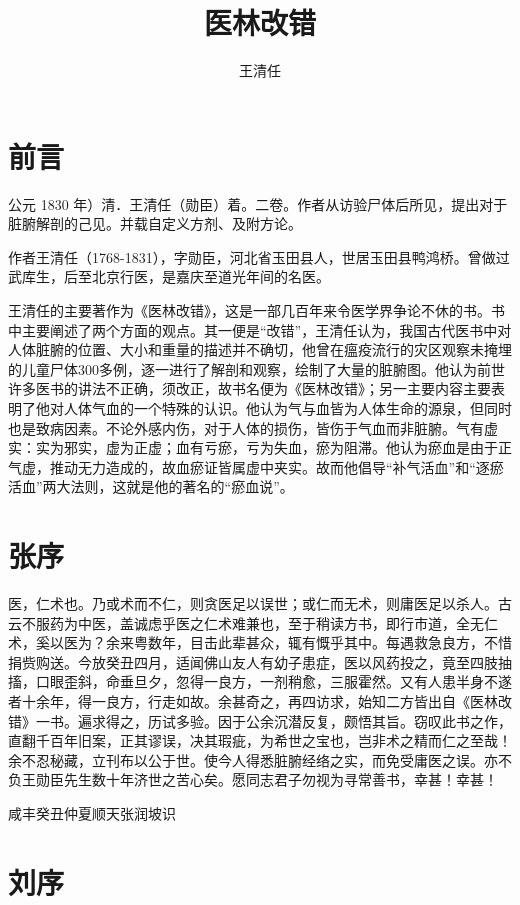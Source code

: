 \documentclass[a4paper,12pt,UTF8,twoside]{ctexbook}
\title{\heiti\zihao{0} 医林改错}
\author{王清任}
\date{}
\begin{document}
	
	\maketitle
	\tableofcontents
	\frontmatter
	
	\chapter{前言}
	公元 1830 年）清．王清任（勋臣）着。二卷。作者从访验尸体后所见，提出对于脏腑解剖的己见。并载自定义方剂、及附方论。
	
	作者王清任（1768-1831），字勋臣，河北省玉田县人，世居玉田县鸭鸿桥。曾做过武库生，后至北京行医，是嘉庆至道光年间的名医。
	
	王清任的主要著作为《医林改错》，这是一部几百年来令医学界争论不休的书。书中主要阐述了两个方面的观点。其一便是“改错”，王清任认为，我国古代医书中对人体脏腑的位置、大小和重量的描述并不确切，他曾在瘟疫流行的灾区观察未掩埋的儿童尸体300多例，逐一进行了解剖和观察，绘制了大量的脏腑图。他认为前世许多医书的讲法不正确，须改正，故书名便为《医林改错》；另一主要内容主要表明了他对人体气血的一个特殊的认识。他认为气与血皆为人体生命的源泉，但同时也是致病因素。不论外感内伤，对于人体的损伤，皆伤于气血而非脏腑。气有虚实：实为邪实，虚为正虚；血有亏瘀，亏为失血，瘀为阻滞。他认为瘀血是由于正气虚，推动无力造成的，故血瘀证皆属虚中夹实。故而他倡导“补气活血”和“逐瘀活血”两大法则，这就是他的著名的“瘀血说”。
	
	\chapter{张序}
	医，仁术也。乃或术而不仁，则贪医足以误世；或仁而无术，则庸医足以杀人。古云不服药为中医，盖诚虑乎医之仁术难兼也，至于稍读方书，即行市道，全无仁术，奚以医为？余来粤数年，目击此辈甚众，辄有慨乎其中。每遇救急良方，不惜捐赀购送。今放癸丑四月，适闻佛山友人有幼子患症，医以风药投之，竟至四肢抽搐，口眼歪斜，命垂旦夕，忽得一良方，一剂稍愈，三服霍然。又有人患半身不遂者十余年，得一良方，行走如故。余甚奇之，再四访求，始知二方皆出自《医林改错》一书。遍求得之，历试多验。因于公余沉潜反复，颇悟其旨。窃叹此书之作，直翻千百年旧案，正其谬误，决其瑕疵，为希世之宝也，岂非术之精而仁之至哉！余不忍秘藏，立刊布以公于世。使今人得悉脏腑经络之实，而免受庸医之误。亦不负王勋臣先生数十年济世之苦心矣。愿同志君子勿视为寻常善书，幸甚！幸甚！
	
	咸丰癸丑仲夏顺天张润坡识
	
	\chapter{刘序}
	
\end{document}
